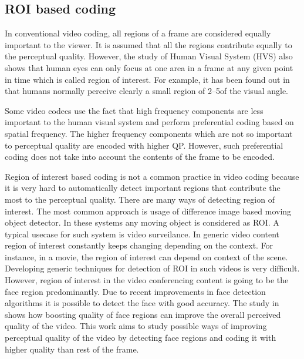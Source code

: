 \documentclass[11pt]{article} %
\begin{document}
\subsection{ROI based coding}

In conventional video coding, all regions of a frame are considered equally important to the viewer. It is assumed that all the regions contribute equally to the perceptual quality. However, the study of Human Visual System (HVS) also shows that human eyes can only focus at one area in a frame at any given point in time which is called region of interest. For example, it has been found out in \cite{human-vision-proof-NSI} that humans normally perceive clearly a small region of 2–5\degree of the visual angle. 

Some video codecs use the fact that high frequency components are less important to the human visual system and perform preferential coding based on spatial frequency. The higher frequency components which are not so important to perceptual quality are encoded with higher QP. However, such preferential coding does not take into account the contents of the frame to be encoded. 

Region of interest based coding is not a common practice in video coding because it is very hard to automatically detect important regions that contribute the most to the perceptual quality. There are many ways of detecting region of interest. The most common approach is usage of difference image based moving object detector. In these systems any moving object is considered as ROI. A typical usecase for such system is video surveilance. In generic video content region of interest constantly keeps changing depending on the context. For instance, in a movie, the region of interest can depend on context of the scene. Developing generic techniques for detection of ROI in such videos is very difficult. However, region of interest in the video conferencing content is going to be the face region predominantly. Due to recent improvements in face detection algorithms it is possible to detect the face with good accuracy. The study in \cite{HighQualityROICodingForVideoConferencing} shows how boosting quality of face regions can improve the overall perceived quality of the video. This work aims to study possible ways of improving perceptual quality of the video by detecting face regions and coding it with higher quality than rest of the frame.
\end{document}
